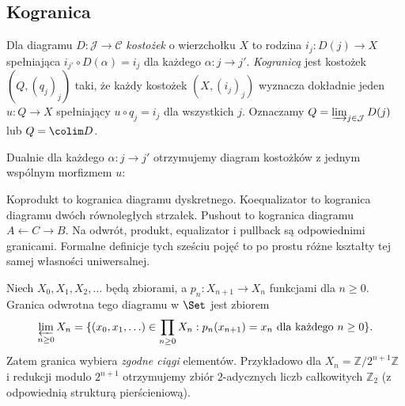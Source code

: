 \subsection{Kogranica}

\begin{definicja}\label{def:colimit}
Dla diagramu $D:\mathcal J\to\mathcal C$ \emph{kostożek} o wierzchołku $X$ to rodzina $i_j:D(j)\to X$ spełniająca $i_{j'}\circ D(\alpha)=i_j$ dla każdego $\alpha:j\to j'$. \emph{Kogranicą} jest kostożek $(Q,(q_j)_j)$ taki, że każdy kostożek $(X,(i_j)_j)$ wyznacza dokładnie jeden $u:Q\to X$ spełniający $u\circ q_j=i_j$ dla wszystkich $j$. Oznaczamy $Q=\varinjlim_{j\in\mathcal J}D(j)$ lub $Q=\colim D$.
\end{definicja}
Dualnie dla każdego $\alpha:j\to j'$ otrzymujemy diagram kostożków z jednym wspólnym morfizmem $u$:
\begin{center}
\end{center}

\begin{przyklad}
Koprodukt to kogranica diagramu dyskretnego. Koequalizator to kogranica diagramu dwóch równoległych strzałek. Pushout to kogranica diagramu $A\leftarrow C\to B$. Na odwrót, produkt, equalizator i pullback są odpowiednimi granicami. Formalne definicje tych sześciu pojęć to po prostu różne kształty tej samej własności uniwersalnej.
\end{przyklad}

\begin{przyklad}\label{przyklad:inverse-limit}
Niech $X_0,X_1,X_2,\ldots$ będą zbiorami, a $p_n:X_{n+1}\to X_n$ funkcjami dla $n\geq0$. Granica odwrotna tego diagramu w $\Set$ jest zbiorem
\[
\varprojlim_{n\geq0}X_n=\{(x_0,x_1,\ldots)\in\prod_{n\geq0}X_n:p_n(x_{n+1})=x_n\text{ dla każdego }n\geq0\}.
\]
Zatem granica wybiera \emph{zgodne ciągi} elementów. Przykładowo dla $X_n=\mathbb Z/2^{n+1}\mathbb Z$ i redukcji modulo $2^{n+1}$ otrzymujemy zbiór $2$-adycznych liczb całkowitych $\mathbb Z_2$ (z odpowiednią strukturą pierścieniową).
\end{przyklad}

